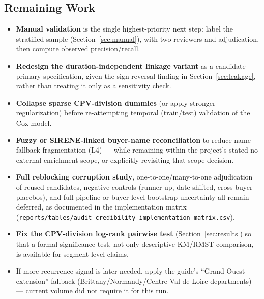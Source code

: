 \documentclass[11pt]{article}
\begin{document}
\subsection{Remaining Work}
\begin{itemize}
  \item \textbf{Manual validation} is the single highest-priority next
  step: label the stratified sample (Section~\ref{sec:manual}), with two
  reviewers and adjudication, then compute observed precision/recall.
  \item \textbf{Redesign the duration-independent linkage variant} as a
  candidate primary specification, given the sign-reversal finding in
  Section~\ref{sec:leakage}, rather than treating it only as a sensitivity
  check.
  \item \textbf{Collapse sparse CPV-division dummies} (or apply stronger
  regularization) before re-attempting temporal (train/test) validation of
  the Cox model.
  \item \textbf{Fuzzy or SIRENE-linked buyer-name reconciliation} to reduce
  name-fallback fragmentation (L4) --- while remaining within the project's
  stated no-external-enrichment scope, or explicitly revisiting that scope
  decision.
  \item \textbf{Full reblocking corruption study}, one-to-one/many-to-one
  adjudication of reused candidates, negative controls (runner-up,
  date-shifted, cross-buyer placebos), and full-pipeline or buyer-level
  bootstrap uncertainty all remain deferred, as documented in the
  implementation matrix (\texttt{reports/tables/}\newline\texttt{audit\_credibility\_implementation\_matrix.csv}).
  \item \textbf{Fix the CPV-division log-rank pairwise test} (Section~\ref{sec:results})
  so that a formal significance test, not only descriptive KM/RMST
  comparison, is available for segment-level claims.
  \item If more recurrence signal is later needed, apply the guide's
  ``Grand Ouest extension'' fallback (Brittany/Normandy/Centre-Val de Loire
  departments) --- current volume did not require it for this run.
\end{itemize}
\end{document}
